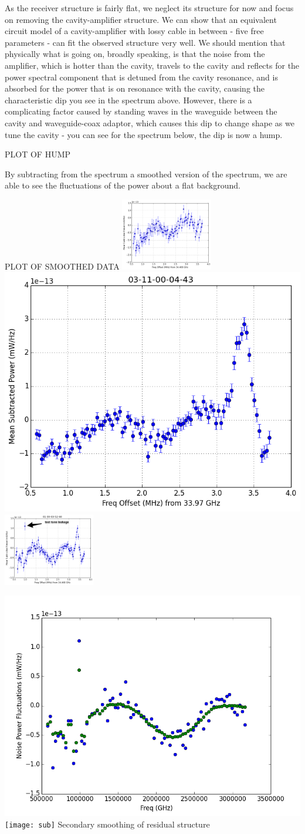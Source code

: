 \documentclass[11pt]{article}
\begin{document}
As the receiver structure is fairly flat, we neglect its structure for now and focus on removing the cavity-amplifier structure. We can show that an equivalent circuit model of a cavity-amplifier with lossy cable in between - five free parameters - can fit the observed structure very well. We should mention that physically what is going on, broadly speaking, is that the noise from the amplifier, which is hotter than the cavity, travels to the cavity and reflects for the power spectral component that is detuned from the cavity resonance, and is absorbed for the power that is on resonance with the cavity, causing the characteristic dip you see in the spectrum above. However, there is a complicating factor caused by standing waves in the waveguide between the cavity and waveguide-coax adaptor, which causes this dip to change shape as we tune the cavity - you can see for the spectrum below, the dip is now a hump.

PLOT OF HUMP

By subtracting from the spectrum a smoothed version of the spectrum, we are able to see the fluctuations of the power about a flat background. 

PLOT OF SMOOTHED DATA
\includegraphics[width=0.3\textwidth]{Dec04-11-33-24avgsubpltposfreq_237}
\includegraphics[width=0.3 \textwidth]{03-11-00-04-43avgsubpltposfreq_261}
\includegraphics[width=0.3\textwidth]{01-30-03-52-40avgsubpltposfreq_261}

\includegraphics[width=0.29 \textwidth]{residualsub}
\texttt{[image: sub]}
Secondary smoothing of residual structure
\end{document}
